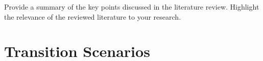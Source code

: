 
Provide a summary of the key points discussed in the literature review. Highlight the relevance of the reviewed literature to your research.


\section{Transition Scenarios}






